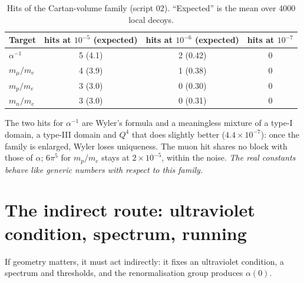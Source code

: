 \documentclass[11pt,a4paper]{article}
\newcommand{\ainv}{\alpha^{-1}}
\begin{document}
\begin{table}[h]\centering
\caption{Hits of the Cartan-volume family (script 02). ``Expected'' is the mean over 4000 local decoys.}\label{tab:cartan}
\begin{tabular}{lccc}\toprule
Target & hits at $10^{-5}$ (expected) & hits at $10^{-6}$ (expected) & hits at $10^{-7}$\\\midrule
$\ainv$ & 5 (4.1) & 2 (0.42) & 0\\
$m_\mu/m_e$ & 4 (3.9) & 1 (0.38) & 0\\
$m_p/m_e$ & 3 (3.0) & 0 (0.30) & 0\\
$m_n/m_e$ & 3 (3.0) & 0 (0.31) & 0\\\bottomrule
\end{tabular}\end{table}

The two hits for $\ainv$ are Wyler's formula and a meaningless mixture of a type-I domain, a type-III domain and $Q^4$ that
does slightly better ($4.4\times10^{-7}$): once the family is enlarged, Wyler loses uniqueness. The muon hit shares no block
with those of $\alpha$; $6\pi^5$ for $m_p/m_e$ stays at $2\times10^{-5}$, within the noise. \emph{The real constants behave
like generic numbers with respect to this family.}

\section{The indirect route: ultraviolet condition, spectrum, running}

If geometry matters, it must act indirectly: it fixes an ultraviolet condition, a spectrum and thresholds, and the
renormalisation group produces $\alpha(0)$.
\end{document}
